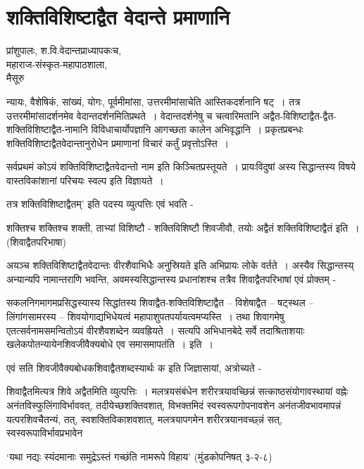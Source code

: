 {\fontsize{15}{17}\selectfont
\chapter{शक्तिविशिष्टाद्वैत वेदान्ते प्रमाणानि}

\begin{center}
\smallskip
प्रांशुपालः, श.वि.वेदान्तप्राध्यापकःच,\\
महाराज-संस्कृत-महापाठशाला,\\
मैसूरु
\addrule
\end{center}
न्यायः, वैशेषिकं, सांख्यं, योगः, पूर्वमीमांसा, उत्तरमीमांसाचेति आस्तिकदर्शनानि षट्~। तत्र उत्तरमीमांसादर्शनमेव वेदान्तदर्शनमितिप्रथते~। वेदान्तदर्शनेषु च चत्वारिमतानि अद्वैत-विशिष्टाद्वैत-द्वैत-शक्तिविशिष्टाद्वैत-नामानि विविधाचार्योपज्ञानि आगच्छता कालेन अभिवृद्धानि~। प्रकृतप्रबन्धः शक्तिविशिष्टाद्वैतवेदान्तानुरोधेन प्रमाणानां विचारं कर्तुं प्रवृत्तोऽस्ति~। 

सर्वप्रथमं कोऽयं शक्तिविशिष्टाद्वैतवेदान्तो नाम इति किञ्चितप्रस्तूयते~। प्रायःविदुषां अस्य सिद्धान्तस्य विषये वास्तविकांशानां परिचयः स्वल्प इति विज्ञायते~। 

तत्र  शक्तिविशिष्टाद्वैतम्’ इति पदस्य व्युत्पत्तिः एवं भवति -

शक्तिश्च शक्तिश्च शक्ती, ताभ्यां विशिष्टौ -  शक्तिविशिष्टौ शिवजीवौ, तयोः अद्वैतं शक्तिविशिष्टाद्वैतं इति~। (शिवाद्वैतपरिभाषा)

अयञ्च शक्तिविशिष्टाद्वैतवेदान्तः वीरशैवाभिधैः अनुस्रियते इति अभिप्रायः लोके वर्तते~। अस्यैव सिद्धान्तस्य् अन्यान्यपि नामान्तराणि भवन्ति, अवमस्यसिद्धान्तस्य प्रधानांशश्च तत्रैव शिवाद्वैतपरिभाषां एवं प्रोक्तम् -

सकलनिगमागमप्रसिद्धस्यास्य सिद्धांतस्य शिवाद्वैत-शक्तिविशिष्टाद्वैत – विशेषाद्वैत – षट्स्थल – लिंगांगसामरस्य – शिवयोगाद्यभिधेयत्वं महापाशुपतपर्यायत्वमप्यस्ति~। तथा शिवागमेषु एतत्सर्वनामसमन्वितोऽयं वीरशैवशब्देन व्यवह्रियते~। सत्यपि अभिधानबेदे सर्वे तदाश्रिताशयाः खलेकपोतन्यायेनशिवजीवैक्यबोधे एव समासमापतंति~। इति~। 

एवं सति शिवजीवैक्यबोधकशिवाद्वैतशब्दस्यार्थः क  इति जिज्ञासायां, अत्रोच्यते -

शिवाद्वैतमित्यत्र शिवे अद्वैतमिति व्युत्पत्तिः~। मलत्रयसंबंधेन शरीरत्रयावच्छिन्नं सत्काष्ठसंयोगावस्थायां वह्नेः अनंतविस्फुलिंगाविर्भाववत्, तदीयेच्छशक्तिवशात्, विभक्तमिदं स्वस्वरूपगोपनावशेन अनंतजीवभावमापन्नं यत्परशिवचैतन्यं, तत्, स्वशक्तिविकाशवशात्, मलत्रयापगमेन शरीरत्रयानवच्छ्न्नं सत्,  स्वस्वरूपाविर्भावप्रभावेन

‘यथा नद्यः स्यंदमानाः समुद्रेऽस्तं गच्छंति नामरूपे विहाय’ (मुंडकोपनिषत् ३-२-८)

}
